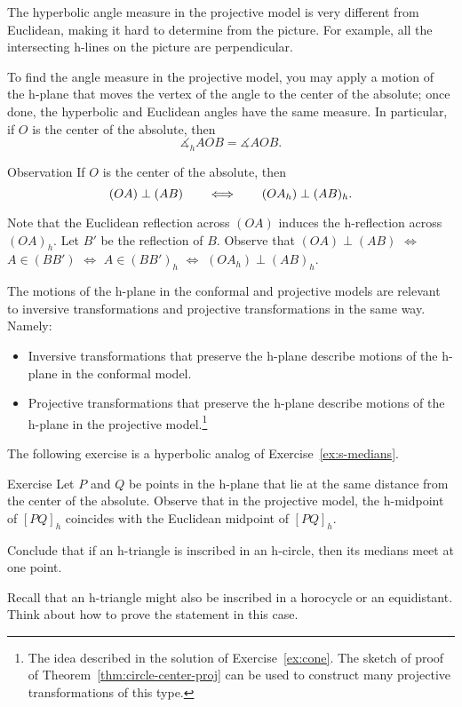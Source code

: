 The hyperbolic angle measure in the projective model is very different from Euclidean, making it hard to determine from the picture. 
\label{klein-angles}
For example, all the intersecting h-lines on the picture 
are perpendicular.

To find the angle measure in the projective model,
you may apply a motion of the h-plane that moves 
the vertex of the angle to the center of the absolute;
once done, the hyperbolic and Euclidean angles have the same measure.
In particular, if $O$ is the center of the absolute, then 
$$\measuredangle_hAOB=\measuredangle AOB.$$

\begin{thm}{Observation}\label{obs:h-p-perp}
If $O$ is the center of the absolute, then 
\[(OA)\perp (AB)\qquad\Longleftrightarrow\qquad(OA_h)\perp (AB)_h.\]

\end{thm}

Note that the Euclidean reflection across $(OA)$ induces the h-reflection across $(OA)_h$.
Let $B'$ be the reflection of $B$.
Observe that $(OA)\perp (AB)$ $\Longleftrightarrow$ $A\in(BB')$ $\Longleftrightarrow$  $A\in(BB')_h$ $\Longleftrightarrow$  $(OA_h)\perp (AB)_h$.
\qeds

The motions of the h-plane in the conformal and projective models are relevant to inversive transformations and projective transformations in the same way.
Namely: 
\begin{itemize}
\item Inversive transformations that preserve the h-plane describe motions of the h-plane in the conformal model.
\item Projective transformations that preserve the h-plane describe motions of the h-plane in the projective model.\footnote{The idea described in the solution of Exercise~\ref{ex:cone}.
The sketch of proof of Theorem~\ref{thm:circle-center-proj} can be used to construct many projective transformations of this type.}
\end{itemize}

The following exercise is a hyperbolic analog of Exercise~\ref{ex:s-medians}. 

\begin{thm}{Exercise}\label{ex:h-median}
Let $P$ and $Q$ be points in the h-plane that lie at the same distance from the center of the absolute.
Observe that in the projective model, the h-midpoint of $[PQ]_h$ coincides with the Euclidean midpoint of $[PQ]_h$.

Conclude that if an h-triangle is inscribed in an h-circle, then its medians meet at one point.

Recall that an h-triangle might also be inscribed in a horocycle or an equidistant.
Think about how to prove the statement in this case.
\end{thm}

